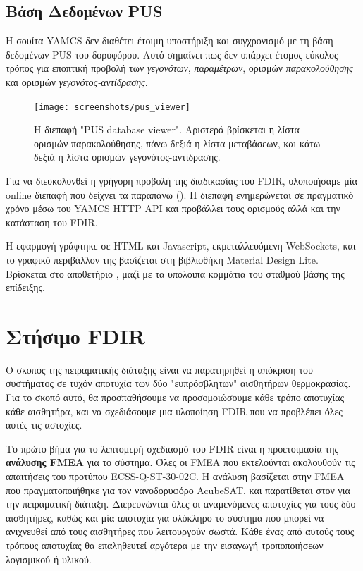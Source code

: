 \documentclass[a4paper,nobib]{tufte-book}
\begin{document}
\subsection{Βάση Δεδομένων \acs{PUS}}
\label{sec:pusinterface}

Η σουίτα \acs{YAMCS} δεν διαθέτει έτοιμη υποστήριξη και συγχρονισμό με τη βάση δεδομένων \acs{PUS} του δορυφόρου. Αυτό σημαίνει πως δεν υπάρχει έτομος εύκολος τρόπος για εποπτική προβολή των \emph{γεγονότων}, \emph{παραμέτρων}, ορισμών \emph{παρακολούθησης} και ορισμών \emph{γεγονότος-αντίδρασης}.

\begin{figure}[h]
	\texttt{[image: screenshots/pus\_viewer]}
	\caption[Η διεπαφή "PUS database viewer"]{Η διεπαφή "\acs{PUS} database viewer". Αριστερά βρίσκεται η λίστα ορισμών παρακολούθησης, πάνω δεξιά η λίστα μεταβάσεων, και κάτω δεξιά η λίστα ορισμών γεγονότος-αντίδρασης.}
	\label{fig:pusviewer}
\end{figure}

Για να διευκολυνθεί η γρήγορη προβολή της διαδικασίας του \acs{FDIR}, υλοποιήσαμε μία online διεπαφή που δείχνει τα παραπάνω (). Η διεπαφή ενημερώνεται σε πραγματικό χρόνο μέσω του \acs{YAMCS} \acs{HTTP} \acs{API} και προβάλλει τους ορισμούς αλλά και την κατάσταση του \acs{FDIR}.

Η εφαρμογή γράφτηκε σε HTML και Javascript, εκμεταλλευόμενη WebSockets, και το γραφικό περιβάλλον της βασίζεται στη βιβλιοθήκη Material Design Lite. Βρίσκεται στο αποθετήριο , μαζί με τα υπόλοιπα κομμάτια του σταθμού βάσης της επίδειξης.


\section{Στήσιμο \acs{FDIR}}

Ο σκοπός της πειραματικής διάταξης είναι να παρατηρηθεί η απόκριση του συστήματος σε τυχόν αποτυχία των δύο "ευπρόσβλητων" αισθητήρων θερμοκρασίας. Για το σκοπό αυτό, θα προσπαθήσουμε να προσομοιώσουμε κάθε τρόπο αποτυχίας κάθε αισθητήρα, και να σχεδιάσουμε μια υλοποίηση \ac{FDIR} που να προβλέπει όλες αυτές τις αστοχίες.

Το πρώτο βήμα για το λεπτομερή σχεδιασμό του \ac{FDIR} είναι η προετοιμασία της \textbf{ανάλυσης FMEA} για το σύστημα. Όλες οι \ac{FMEA} που εκτελούνται ακολουθούν τις απαιτήσεις του προτύπου ECSS-Q-ST-30-02C.\autocite{ECSS-Q-ST-30-02C} Η ανάλυση βασίζεται στην \ac{FMEA} που πραγματοποιήθηκε για τον νανοδορυφόρο AcubeSAT,\autocite{retselis_acubesat_fmea_2020} και παρατίθεται στον  για την πειραματική διάταξη. Διερευνώνται όλες οι αναμενόμενες αποτυχίες για τους δύο αισθητήρες, καθώς και μία αποτυχία για ολόκληρο το σύστημα που μπορεί να ανιχνευθεί από τους αισθητήρες που λειτουργούν σωστά. Κάθε ένας από αυτούς τους τρόπους αποτυχίας θα επαληθευτεί αργότερα με την εισαγωγή τροποποιήσεων λογισμικού ή υλικού.
\end{document}
